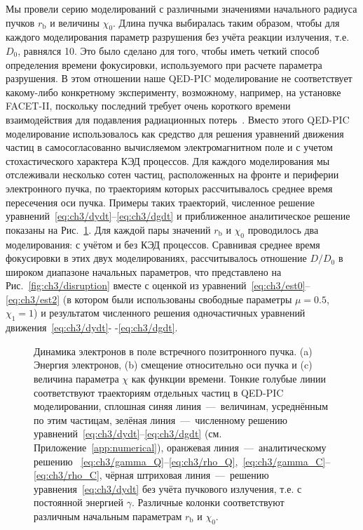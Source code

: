 Мы провели серию моделирований с различными значениями начального радиуса пучков $r_\mathrm{b}$ и величины $\chi_0$.
Длина пучка выбиралась таким образом, чтобы для каждого моделирования параметр разрушения без учёта реакции излучения, т.е. $D_0$, равнялся 10.
Это было сделано для того, чтобы иметь четкий способ определения времени фокусировки, используемого при расчете параметра разрушения.
В этом отношении наше QED-PIC моделирование не соответствует какому-либо конкретному эксперименту, возможному, например, на установке FACET-II, поскольку последний требует очень короткого времени взаимодействия для подавления радиационных потерь~\cite{yakimenko2019prospect}.
Вместо этого QED-PIC моделирование использовалось как средство для решения уравнений движения частиц в самосогласованно вычисляемом электромагнитном поле и с учетом стохастического характера КЭД процессов.
Для каждого моделирования мы отслеживали несколько сотен частиц, расположенных на фронте и периферии электронного пучка, по траекториям которых рассчитывалось среднее время пересечения оси пучка.
Примеры таких траекторий, численное решение уравнений~\eqref{eq:ch3/dydt}--\eqref{eq:ch3/dgdt} и приближенное аналитическое решение показаны на Рис.~\ref{fig:ch3/tracks}.
Для каждой пары значений $r_\mathrm{b}$ и $\chi_0$ проводилось два моделирования: с учётом и без КЭД процессов.
Сравнивая среднее время фокусировки в этих двух моделированиях, рассчитывалось отношение $D/D_0$ в широком диапазоне начальных параметров, что представлено на Рис.~\ref{fig:ch3/disruption} вместе с оценкой из уравнений~\eqref{eq:ch3/est0}-- \eqref{eq:ch3/est2} (в котором были использованы свободные параметры $\mu=0.5$, $\chi_1=1$) и результатом численного решения одночастичных уравнений движения~\eqref{eq:ch3/dydt}- -\eqref{eq:ch3/dgdt}.

\begin{figure}[ht]
    \caption[Динамика электронов в поле встречного позитронного пучка]{\label{fig:ch3/tracks} 
    Динамика электронов в поле встречного позитронного пучка. (a) Энергия электронов, (b) смещение относительно оси пучка и (c) величина параметра $\chi$ как функции времени.
    Тонкие голубые линии соответствуют траекториям отдельных частиц в QED-PIC моделировании, сплошная синяя линия~---~величинам, усреднённым по этим частицам, зелёная линия~---~численному решению уравнений~\eqref{eq:ch3/dydt}--\eqref{eq:ch3/dgdt} (см. Приложение~\ref{app:numerical}), оранжевая линия~---~аналитическому решению ~\eqref{eq:ch3/gamma_Q}--\eqref{eq:ch3/rho_Q},~\eqref{eq:ch3/gamma_C}--\eqref{eq:ch3/rho_C}, чёрная штриховая линия~---~решению уравнения~\eqref{eq:ch3/dydt} без учёта пучкового излучения, т.е. с постоянной энергией $\gamma$.
    Различные колонки соответствуют различным начальным параметрам $r_\mathrm{b}$ и $\chi_0$.}
\end{figure}

